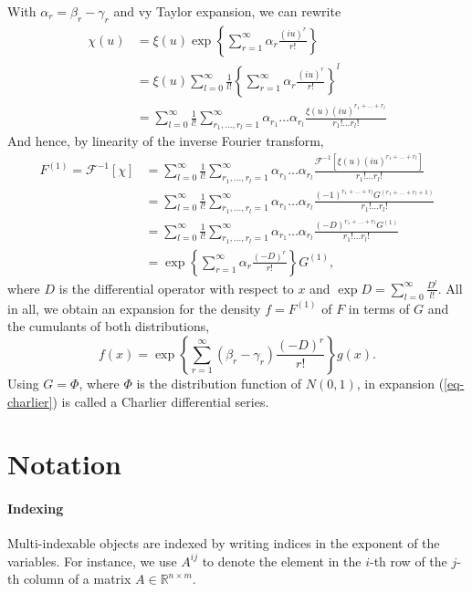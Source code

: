 With $\alpha_r = \beta_r - \gamma_r$ and vy Taylor expansion, we can rewrite
\begin{align*}
    \chi(u)
    &= \xi(u)\exp\left\{\sum_{r=1}^\infty \alpha_r\frac{(iu)^r}{r!}\right\} \\
    &= \xi(u)\sum_{l=0}^\infty \frac{1}{l!}\left\{\sum_{r=1}^\infty \alpha_r\frac{(iu)^r}{r!}\right\}^l \\
    &= \sum_{l=0}^\infty \frac{1}{l!} \sum_{r_1, \ldots, r_l=1}^\infty \alpha_{r_1}\ldots\alpha_{r_l}\frac{\xi(u)(iu)^{r_1 + \ldots + r_l}}{r_1!\ldots r_l!}
\end{align*}
And hence, by linearity of the inverse Fourier transform, 
\begin{align*}
    F^{(1)} = \mathcal{F}^{-1}\left[\chi\right]
    &= \sum_{l=0}^\infty \frac{1}{l!} \sum_{r_1, \ldots, r_l=1}^\infty \alpha_{r_1}\ldots\alpha_{r_l}\frac{\mathcal{F}^{-1}\left[\xi(u)(iu)^{r_1 + \ldots + r_l}\right]}{r_1!\ldots r_l!}\\
    &= \sum_{l=0}^\infty \frac{1}{l!} \sum_{r_1, \ldots, r_l=1}^\infty \alpha_{r_1}\ldots\alpha_{r_l}\frac{(-1)^{r_1 + \ldots + r_l}G^{(r_1 + \ldots + r_l + 1)}}{r_1!\ldots r_l!}\\
    &= \sum_{l=0}^\infty \frac{1}{l!} \sum_{r_1, \ldots, r_l=1}^\infty \alpha_{r_1}\ldots\alpha_{r_l}\frac{(-D)^{r_1 + \ldots + r_l}G^{(1)}}{r_1!\ldots r_l!}\\
    &= \exp\left\{\sum_{r=1}^\infty \alpha_r\frac{(-D)^r}{r!}\right\}G^{(1)},
\end{align*}
where $D$ is the differential operator with respect to $x$ and $\exp D = \sum_{l=0}^\infty \frac{D^l}{l!}$. All in all, we obtain an expansion for the density $f = F^{(1)}$ of $F$ in terms of $G$ and the cumulants of both distributions,
\begin{equation}\label{eq-charlier}
    f(x) = \exp\left\{\sum_{r=1}^\infty (\beta_r - \gamma_r)\frac{(-D)^r}{r!}\right\}g(x).
\end{equation}
Using $G = \Phi$, where $\Phi$ is the distribution function of $N(0, 1)$, in expansion (\ref{eq-charlier}) is called a Charlier differential series.
\newpage

\section{Notation}

\paragraph{Indexing} Multi-indexable objects are indexed by writing indices in the exponent of the variables. For instance, we use $A^{ij}$ to denote the element in the $i$-th row of the $j$-th column of a matrix $A \in \mathbb{R}^{n\times m}$.

